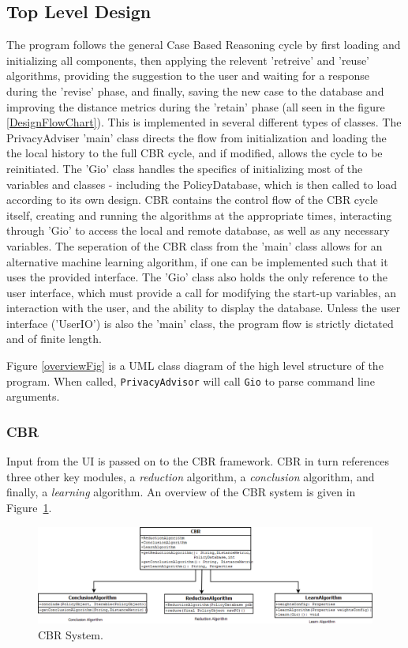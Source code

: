 \subsection{Top Level Design}
The program follows the general Case Based Reasoning cycle by first loading and initializing all components, then applying the relevent 'retreive' and 'reuse' algorithms, providing the suggestion to the user and waiting for a response during the 'revise' phase, and finally, saving the new case to the database and improving the distance metrics during the 'retain' phase (all seen in the figure \ref{DesignFlowChart}).
This is implemented in several different types of classes. The PrivacyAdviser 'main' class directs the flow from initialization and loading the the local history to the full CBR cycle, and if modified, allows the cycle to be reinitiated. The 'Gio' class handles the specifics of initializing most of the variables and classes - including the PolicyDatabase, which is then called to load according to its own design. CBR contains the control flow of the CBR cycle itself, creating and running the algorithms at the appropriate times, interacting through 'Gio' to access the local and remote database, as well as any necessary variables. The seperation of the CBR class from the 'main' class allows for an alternative machine learning algorithm, if one can be implemented such that it uses the provided interface. The 'Gio' class also holds the only reference to the user interface, which must provide a call for modifying the start-up variables, an interaction with the user, and the ability to display the database. Unless the user interface ('UserIO') is also the 'main' class, the program flow is strictly dictated and of finite length.

Figure \ref{overviewFig} is a UML class diagram of the high level structure of the program. When called, \texttt{PrivacyAdvisor} will call \texttt{Gio} to parse command line arguments. 


\subsubsection{CBR} 
Input from the UI is passed on to the CBR framework. CBR in turn references three other key modules, a \emph{reduction} algorithm, a \emph{conclusion} algorithm, and finally, a \emph{learning} algorithm. An overview of the CBR system is given in Figure~\ref{cbr_fig}.

\begin{figure}[h!]
\begin{center}
\includegraphics[width = \textwidth]{DesignReport/uml/CBR.png}
\caption{CBR System.}
\label{cbr_fig}
\end{center}
\end{figure}


